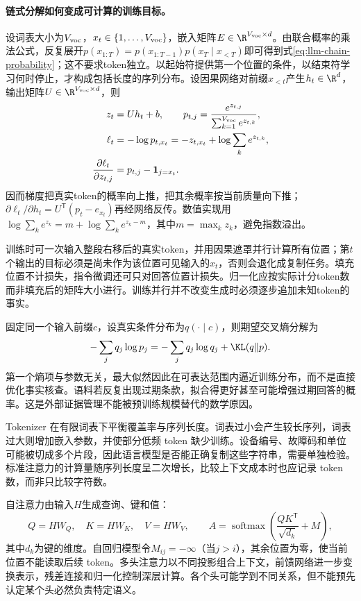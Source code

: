 \paragraph{链式分解如何变成可计算的训练目标。}
设词表大小为$V_{\rm voc}$，$x_t\in\{1,\ldots,V_{\rm voc}\}$，嵌入矩阵$E\in\R^{V_{\rm voc}\times d}$。由联合概率的乘法公式，反复展开$p(x_{1:T})=p(x_{1:T-1})p(x_T\mid x_{<T})$即可得到式\eqref{eq:llm-chain-probability}；这不要求token独立。以起始符提供第一个位置的条件，以结束符学习何时停止，才构成包括长度的序列分布。设因果网络对前缀$x_{<t}$产生$h_t\in\R^d$，输出矩阵$U\in\R^{V_{\rm voc}\times d}$，则
\begin{align}
 z_t&=Uh_t+b,\qquad p_{t,j}=\frac{e^{z_{t,j}}}{\sum_{k=1}^{V_{\rm voc}}e^{z_{t,k}}},\\
 \ell_t&=-\log p_{t,x_t}=-z_{t,x_t}+\log\sum_ke^{z_{t,k}},\\
 \frac{\partial\ell_t}{\partial z_{t,j}}&=p_{t,j}-\mathbf1_{j=x_t}.
\end{align}
因而梯度把真实token的概率向上推，把其余概率按当前质量向下推；$\partial\ell_t/\partial h_t=U^{\mathsf T}(p_t-e_{x_t})$再经网络反传。数值实现用$\log\sum_ke^{z_k}=m+\log\sum_ke^{z_k-m}$，其中$m=\max_k z_k$，避免指数溢出。

训练时可一次输入整段右移后的真实token，并用因果遮罩并行计算所有位置；第$t$个输出的目标必须是尚未作为该位置可见输入的$x_t$，否则会退化成复制任务。填充位置不计损失，指令微调还可只对回答位置计损失。归一化应按实际计分token数而非填充后的矩阵大小进行。训练并行并不改变生成时必须逐步追加未知token的事实。

固定同一个输入前缀$c$，设真实条件分布为$q(\cdot\mid c)$，则期望交叉熵分解为
\begin{equation}
 -\sum_jq_j\log p_j=-\sum_jq_j\log q_j+\KL(q\|p).
\end{equation}
第一个熵项与参数无关，最大似然因此在可表达范围内逼近训练分布，而不是直接优化事实核查。语料若反复出现过期条款，拟合得更好甚至可能增强过期回答的概率。这是外部证据管理不能被预训练规模替代的数学原因。

Tokenizer 在有限词表下平衡覆盖率与序列长度。词表过小会产生较长序列，词表过大则增加嵌入参数，并使部分低频 token 缺少训练。设备编号、故障码和单位可能被切成多个片段，因此语言模型是否能正确复制这些字符串，需要单独检验。标准注意力的计算量随序列长度呈二次增长，比较上下文成本时也应记录 token 数，而非只比较字符数。

自注意力由输入$H$生成查询、键和值：
\begin{equation}
 Q=HW_Q,\quad K=HW_K,\quad V=HW_V,
 \qquad A=\operatorname{softmax}\left(\frac{QK^{\mathsf T}}{\sqrt{d_k}}+M\right),
\end{equation}
其中$d_k$为键的维度。自回归模型令$M_{ij}=-\infty$（当$j>i$），其余位置为零，使当前位置不能读取后续 token。多头注意力以不同投影组合上下文，前馈网络进一步变换表示，残差连接和归一化控制深层计算。各个头可能学到不同关系，但不能预先认定某个头必然负责特定语义。


